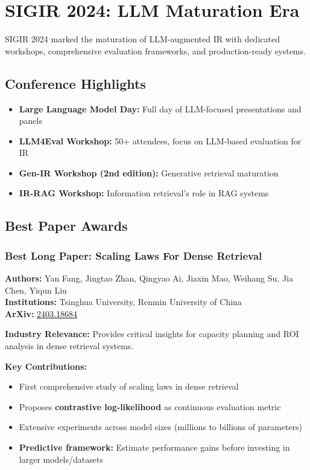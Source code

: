 \documentclass[11pt,letterpaper]{article}
\begin{document}
\newpage

\section{\textcolor{year2024}{SIGIR 2024: LLM Maturation Era}}

SIGIR 2024 marked the maturation of LLM-augmented IR with dedicated workshops, comprehensive evaluation frameworks, and production-ready systems.

\subsection{Conference Highlights}

\begin{itemize}[leftmargin=*]
    \item \textbf{Large Language Model Day:} Full day of LLM-focused presentations and panels
    \item \textbf{LLM4Eval Workshop:} 50+ attendees, focus on LLM-based evaluation for IR
    \item \textbf{Gen-IR Workshop (2nd edition):} Generative retrieval maturation
    \item \textbf{IR-RAG Workshop:} Information retrieval's role in RAG systems
\end{itemize}

\subsection{Best Paper Awards}

\subsubsection{Best Long Paper: Scaling Laws For Dense Retrieval}
\textbf{Authors:} Yan Fang, Jingtao Zhan, Qingyao Ai, Jiaxin Mao, Weihang Su, Jia Chen, Yiqun Liu\\
\textbf{Institutions:} Tsinghua University, Renmin University of China\\
\textbf{ArXiv:} \href{https://arxiv.org/abs/2403.18684}{2403.18684}

\textbf{Industry Relevance:} Provides critical insights for capacity planning and ROI analysis in dense retrieval systems.

\textbf{Key Contributions:}
\begin{itemize}[leftmargin=*]
    \item First comprehensive study of scaling laws in dense retrieval
    \item Proposes \textbf{contrastive log-likelihood} as continuous evaluation metric
    \item Extensive experiments across model sizes (millions to billions of parameters)
    \item \textbf{Predictive framework:} Estimate performance gains before investing in larger models/datasets
\end{itemize}
\end{document}
